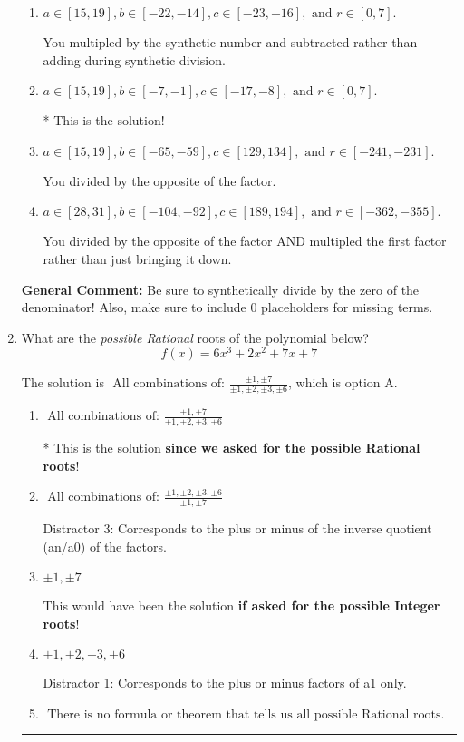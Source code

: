 \documentclass{extbook}[14pt]
\newcommand{\litem}[1]{\item #1

\rule{\textwidth}{0.4pt}}
\begin{document}
\begin{enumerate}
{\begin{enumerate}[label=\Alph*.]
 You multipled by the synthetic number rather than bringing the first factor down.
\item \( a \in [15, 19], b \in [-22, -14], c \in [-23, -16], \text{ and } r \in [0, 7]. \)

 You multipled by the synthetic number and subtracted rather than adding during synthetic division.
\item \( a \in [15, 19], b \in [-7, -1], c \in [-17, -8], \text{ and } r \in [0, 7]. \)

* This is the solution!
\item \( a \in [15, 19], b \in [-65, -59], c \in [129, 134], \text{ and } r \in [-241, -231]. \)

 You divided by the opposite of the factor.
\item \( a \in [28, 31], b \in [-104, -92], c \in [189, 194], \text{ and } r \in [-362, -355]. \)

 You divided by the opposite of the factor AND multipled the first factor rather than just bringing it down.
\end{enumerate}

\textbf{General Comment:} Be sure to synthetically divide by the zero of the denominator! Also, make sure to include 0 placeholders for missing terms.
}
\litem{
What are the \textit{possible Rational} roots of the polynomial below?
\[ f(x) = 6x^{3} +2 x^{2} +7 x + 7 \]

The solution is \( \text{ All combinations of: }\frac{\pm 1,\pm 7}{\pm 1,\pm 2,\pm 3,\pm 6} \), which is option A.\begin{enumerate}[label=\Alph*.]
\item \( \text{ All combinations of: }\frac{\pm 1,\pm 7}{\pm 1,\pm 2,\pm 3,\pm 6} \)

* This is the solution \textbf{since we asked for the possible Rational roots}!
\item \( \text{ All combinations of: }\frac{\pm 1,\pm 2,\pm 3,\pm 6}{\pm 1,\pm 7} \)

 Distractor 3: Corresponds to the plus or minus of the inverse quotient (an/a0) of the factors. 
\item \( \pm 1,\pm 7 \)

This would have been the solution \textbf{if asked for the possible Integer roots}!
\item \( \pm 1,\pm 2,\pm 3,\pm 6 \)

 Distractor 1: Corresponds to the plus or minus factors of a1 only.
\item \( \text{ There is no formula or theorem that tells us all possible Rational roots.} \)


\end{enumerate}}
\end{enumerate}
\end{document}
